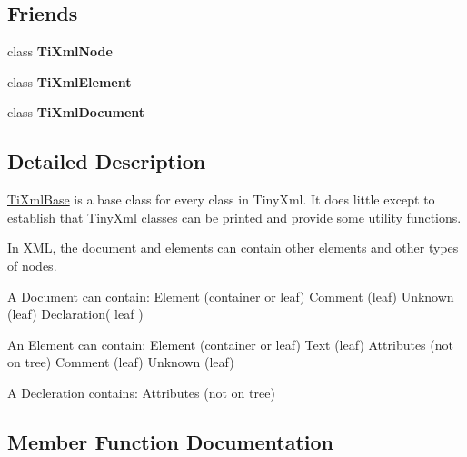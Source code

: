 \subsection*{Friends}
\begin{DoxyCompactItemize}
\item 
\mbox{\label{classTiXmlBase_a218872a0d985ae30e78c55adc4bdb196}} 
class {\bfseries Ti\+Xml\+Node}
\item 
\mbox{\label{classTiXmlBase_ab6592e32cb9132be517cc12a70564c4b}} 
class {\bfseries Ti\+Xml\+Element}
\item 
\mbox{\label{classTiXmlBase_a173617f6dfe902cf484ce5552b950475}} 
class {\bfseries Ti\+Xml\+Document}
\end{DoxyCompactItemize}


\subsection{Detailed Description}
\hyperlink{classTiXmlBase}{Ti\+Xml\+Base} is a base class for every class in Tiny\+Xml. It does little except to establish that Tiny\+Xml classes can be printed and provide some utility functions.

In X\+ML, the document and elements can contain other elements and other types of nodes.

\begin{DoxyVerb}A Document can contain: Element (container or leaf)
                        Comment (leaf)
                        Unknown (leaf)
                        Declaration( leaf )

An Element can contain: Element (container or leaf)
                        Text    (leaf)
                        Attributes (not on tree)
                        Comment (leaf)
                        Unknown (leaf)

A Decleration contains: Attributes (not on tree)
\end{DoxyVerb}
 

\subsection{Member Function Documentation}
\mbox{\label{classTiXmlBase_a32ed202562b58de64c7d799ca3c9db98}} 
